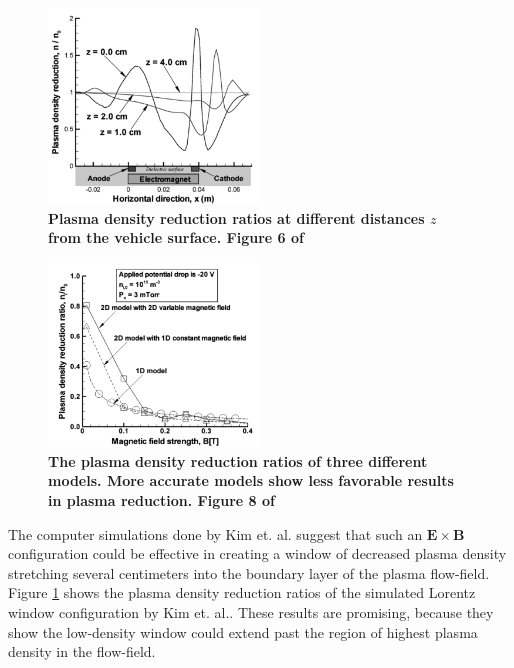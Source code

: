 \documentclass[twocolumn]{article}
\begin{document}
			\begin{figure}[!ht]
				\centering
				\includegraphics[width=0.5\textwidth]{Images/Kim_DensityReduction}
				\caption[Simulated plasma density reduction of an ExB field.]{\textbf{Plasma density reduction ratios at different distances $z$ from the vehicle surface. Figure 6 of \cite{kim_modeling_2010}}}
				\label{fig:Kim_DensityReduction}
			\end{figure}
			
			\begin{figure}[!ht]
				\centering
				\includegraphics[width=0.5\textwidth]{Images/Kim_DensityModeling}
				\caption[Density reduction ratio of an ExB field with different models.]{\textbf{The plasma density reduction ratios of three different models. More accurate models show less favorable results in plasma reduction. Figure 8 of \cite{kim_modeling_2010}}}
				\label{fig:Kim_DensityModeling}
			\end{figure}
			
			The computer simulations done by Kim et. al. suggest that such an $\mathbf{E \times B}$ configuration could be effective in creating a window of decreased plasma density stretching several centimeters into the boundary layer of the plasma flow-field.
			Figure \ref{fig:Kim_DensityReduction} shows the plasma density reduction ratios of the simulated Lorentz window configuration by Kim et. al..
			These results are promising, because they show the low-density window could extend past the region of highest plasma density in the flow-field.\cite{kim_modeling_2010}
			
\end{document}
